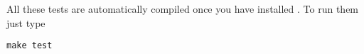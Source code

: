 All these tests are automatically compiled once you have installed \lifev. To run them just type
\begin{lstlisting}
make test
\end{lstlisting}



%

%
%
